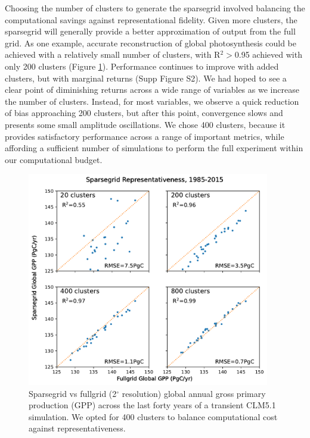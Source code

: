 \documentclass[draft]{agujournal2019}
\begin{document}
Choosing the number of clusters to generate the sparsegrid involved balancing the computational savings against representational fidelity. Given more clusters, the sparsegrid will generally provide a better approximation of output from the full grid. As one example, accurate reconstruction of global photosynthesis could be achieved with a relatively small number of clusters, with R$^2>$0.95 achieved with only 200 clusters (Figure \ref{fig:sg}).
Performance continues to improve with added clusters, but with marginal returns (Supp Figure S2).
We had hoped to see a clear point of diminishing returns across a wide range of variables as we increase the number of clusters. Instead, for most variables, we observe a quick reduction of bias approaching 200 clusters, but after this point, convergence slows and presents some small amplitude oscillations. We chose 400 clusters, because it provides satisfactory performance across a range of important metrics, while affording a sufficient number of simulations to perform the full experiment within our computational budget.
\begin{figure}[h]
\centering
\includegraphics[width=25pc]{../figs/main/sparsegrid_gpp.pdf}
\caption{Sparsegrid vs fullgrid (2$^{\circ}$ resolution) global annual gross primary production (GPP) across the last forty years of a transient CLM5.1 simulation. We opted for 400 clusters to balance computational cost against representativeness.}
\label{fig:sg}
\end{figure}
\end{document}
